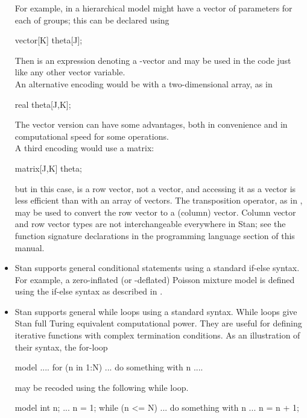 \begin{itemize}
  For example, in a hierarchical model might have a vector of 
  parameters for each of  groups; this can be declared using
\begin{stancode}
vector[K] theta[J];
\end{stancode}
%
Then  is an expression denoting a -vector and
may be used in the code just like any other vector variable.
\\[6pt]
An alternative encoding would be with a two-dimensional array, as in
\begin{stancode}
real theta[J,K];
\end{stancode}
%
The vector version can have some advantages, both in convenience and
in computational speed for some operations.
\\[6pt]
A third encoding would use a matrix:
%
\begin{stancode}
matrix[J,K] theta;
\end{stancode}
%
but in this case,  is a row vector, not a vector, and
accessing it as a vector is less efficient than with an array of
vectors.  The transposition operator, as in , may be
used to convert the row vector  to a (column) vector.
Column vector and row vector types are not interchangeable everywhere
in Stan; see the function signature declarations in the programming
language section of this manual.
%
\item Stan supports general conditional statements using a standard
  if-else syntax.  For example, a zero-inflated (or -deflated) Poisson
  mixture model is defined using the if-else syntax as described in
  .
%
\item Stan supports general while loops using a standard syntax.
While loops give Stan full Turing equivalent computational power.
They are useful for defining iterative functions with complex
termination conditions.  As an illustration of their syntax,
the for-loop
%
\begin{stancode}
model {
    ....
    for (n in 1:N) {
        ... do something with n ....
    }
}
\end{stancode}
%
may be recoded using the following while loop.
%
\begin{stancode}
model {
    int n;
    ...
    n = 1;
    while (n <= N) {
        ... do something with n ...
        n = n + 1;
    }
}
\end{stancode}
%


\end{itemize}


